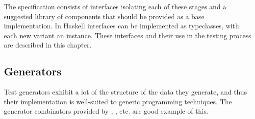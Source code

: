 
The specification consists of interfaces isolating each of these stages
and a suggested library of components that should be provided as a base implementation.
In Haskell interfaces can be implemented as typeclasses,
with each new variant an instance.
These interfaces and their use in the testing process are described in
this chapter.

\subsection{Generators}
Test generators exhibit a lot of the structure of the data they generate,
and thus their implementation is well-suited to
generic programming techniques.
The generator combinators provided by \QC, \SC, etc.
are good example of this.
